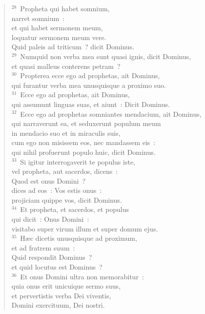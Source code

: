 \begin{verse}
${}^{28}$~Propheta qui habet somnium,\\ narret somnium~:\\ et qui habet sermonem meum,\\ loquatur sermonem meum vere.\\ Quid paleis ad triticum~? dicit Dominus.\\
${}^{29}$~Numquid non verba mea sunt quasi ignis, dicit Dominus,\\ et quasi malleus conterens petram~?\\
${}^{30}$~Propterea ecce ego ad prophetas, ait Dominus,\\ qui furantur verba mea unusquisque a proximo suo.\\
${}^{31}$~Ecce ego ad prophetas, ait Dominus,\\ qui assumunt linguas suas, et aiunt~: Dicit Dominus.\\
${}^{32}$~Ecce ego ad prophetas somniantes mendacium, ait Dominus,\\ qui narraverunt ea, et seduxerunt populum meum\\ in mendacio suo et in miraculis suis,\\ cum ego non misissem eos, nec mandassem eis~:\\ qui nihil profuerunt populo huic, dicit Dominus.\\
${}^{33}$~Si igitur interrogaverit te populus iste,\\ vel propheta, aut sacerdos, dicens~:\\ Quod est onus Domini~?\\ dices ad eos~: Vos estis onus~:\\ projiciam quippe vos, dicit Dominus.\\
${}^{34}$~Et propheta, et sacerdos, et populus\\ qui dicit~: Onus Domini~:\\ visitabo super virum illum et super domum ejus.\\
${}^{35}$~H\ae c dicetis unusquisque ad proximum,\\ et ad fratrem suum~:\\ Quid respondit Dominus~?\\ et quid locutus est Dominus~?\\
${}^{36}$~Et onus Domini ultra non memorabitur~:\\ quia onus erit unicuique sermo suus,\\ et pervertistis verba Dei viventis,\\ Domini exercituum, Dei nostri.\\

\end{verse}

